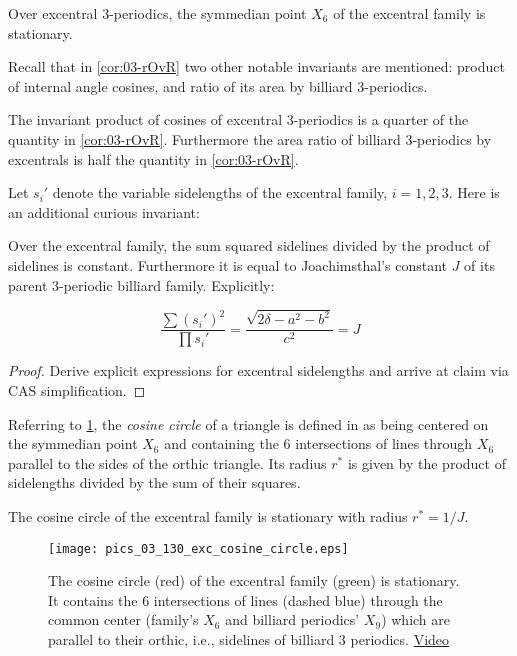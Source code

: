 \begin{corollary}
Over excentral 3-periodics, the symmedian point $X_6$ of the excentral family is stationary.
\end{corollary}

Recall that in \cref{cor:03-rOvR} two other notable invariants are mentioned: product of internal angle cosines, and ratio of its area by billiard 3-periodics.

\begin{corollary}
The invariant product of cosines of excentral 3-periodics is a quarter of the quantity in \cref{cor:03-rOvR}. Furthermore the area ratio of billiard 3-periodics by excentrals is half the quantity in \cref{cor:03-rOvR}.
\end{corollary}

Let $s_i'$ denote the variable sidelengths of the excentral family, $i=1,2,3$. Here is an additional curious invariant:

\begin{proposition}
Over the excentral family, the sum squared sidelines divided by the product of sidelines is constant. Furthermore it is equal to Joachimsthal's constant $J$ of its parent 3-periodic billiard family. Explicitly:

\[ \frac{\sum{(s_i')^2}}{\prod{s_i'}}=\frac{\sqrt{2\delta-a^2-b^2}}{c^2}={J} \]
\end{proposition}

\begin{proof}
Derive explicit expressions for excentral sidelengths and arrive at claim via CAS simplification.
\end{proof}

Referring to \cref{fig:03-cos-circle}, the {\em cosine circle} of a triangle is defined in \cite[Cosine Circle]{mw} as being centered on the symmedian point $X_6$ and containing the 6 intersections of lines through $X_6$ parallel to the sides of the orthic triangle. Its radius $r^*$ is given by the product of sidelengths divided by the sum of their squares.

\begin{corollary}
The cosine circle of the excentral family is stationary with radius $r^*=1/J$.
\end{corollary}

\begin{figure}
    \centering
    \texttt{[image: pics\_03\_130\_exc\_cosine\_circle.eps]}
    \caption{The cosine circle (red) of the excentral family (green) is stationary. It contains the 6 intersections of lines (dashed blue) through the common center (family's $X_6$ and billiard periodics' $X_9$) which are parallel to their orthic, i.e., sidelines of billiard 3 periodics. \href{https://youtu.be/CrOSI8d8qDc}{Video}}
    \label{fig:03-cos-circle}
\end{figure}

